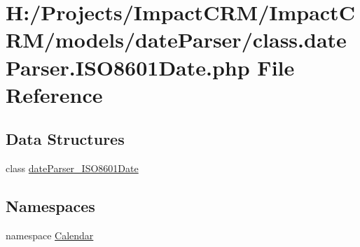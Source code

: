 \hypertarget{class_8dateParser_8ISO8601Date_8php}{
\section{H:/Projects/ImpactCRM/ImpactCRM/models/dateParser/class.dateParser.ISO8601Date.php File Reference}
\label{class_8dateParser_8ISO8601Date_8php}
}
\subsection*{Data Structures}
\begin{DoxyCompactItemize}
\item 
class \hyperlink{classdateParser__ISO8601Date}{dateParser\_\-ISO8601Date}
\end{DoxyCompactItemize}
\subsection*{Namespaces}
\begin{DoxyCompactItemize}
\item 
namespace \hyperlink{namespaceCalendar}{Calendar}
\end{DoxyCompactItemize}
